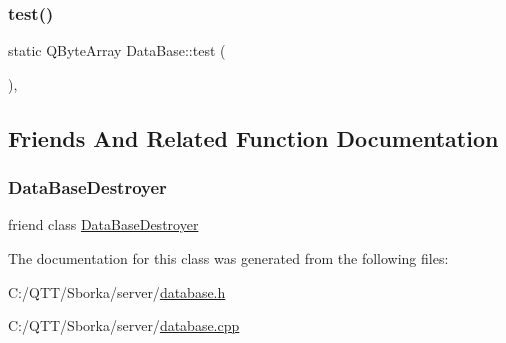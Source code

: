 \mbox{\label{class_data_base_a0f8839a75f6881d6b4a9e7d3eed0fb78}} 
\subsubsection{\texorpdfstring{test()}{test()}}
{\footnotesize\ttfamily static Q\+Byte\+Array Data\+Base\+::test (\begin{DoxyParamCaption}{ }\end{DoxyParamCaption})\hspace{0.3cm}{\ttfamily [inline]}, {\ttfamily [static]}}



\subsection{Friends And Related Function Documentation}
\mbox{\label{class_data_base_a2de1189b514a6e1f7c31c180dc27f000}} 
\subsubsection{\texorpdfstring{Data\+Base\+Destroyer}{DataBaseDestroyer}}
{\footnotesize\ttfamily friend class \mbox{\hyperlink{class_data_base_destroyer}{Data\+Base\+Destroyer}}\hspace{0.3cm}{\ttfamily [friend]}}



The documentation for this class was generated from the following files\+:\begin{DoxyCompactItemize}
\item 
C\+:/\+Q\+T\+T/\+Sborka/server/\mbox{\hyperlink{database_8h}{database.\+h}}\item 
C\+:/\+Q\+T\+T/\+Sborka/server/\mbox{\hyperlink{database_8cpp}{database.\+cpp}}\end{DoxyCompactItemize}

